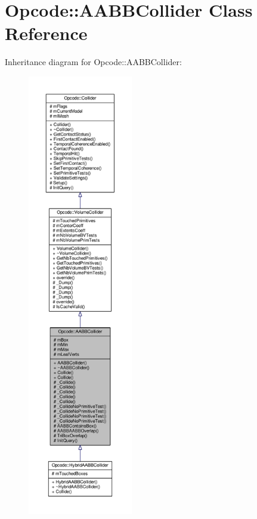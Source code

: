 \hypertarget{classOpcode_1_1AABBCollider}{}\section{Opcode\+:\+:A\+A\+B\+B\+Collider Class Reference}
\label{classOpcode_1_1AABBCollider}


Inheritance diagram for Opcode\+:\+:A\+A\+B\+B\+Collider\+:
\nopagebreak
\begin{figure}[H]
\begin{center}
\leavevmode
\includegraphics[height=550pt]{d7/d1b/classOpcode_1_1AABBCollider__inherit__graph}
\end{center}
\end{figure}



